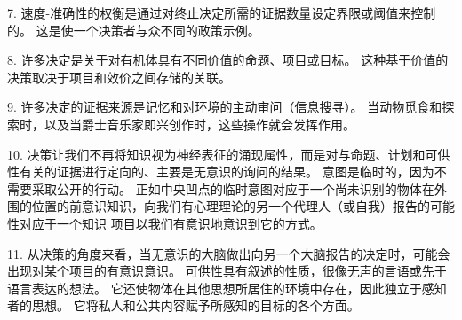 7. 速度-准确性的权衡是通过对终止决定所需的证据数量设定界限或阈值来控制的。
这是使一个决策者与众不同的政策示例。


8. 许多决定是关于对有机体具有不同价值的命题、项目或目标。
这种基于价值的决策取决于项目和效价之间存储的关联。 


9. 许多决定的证据来源是记忆和对环境的主动审问（信息搜寻）。
当动物觅食和探索时，以及当爵士音乐家即兴创作时，这些操作就会发挥作用。


10. 决策让我们不再将知识视为神经表征的涌现属性，而是对与命题、计划和可供性有关的证据进行定向的、主要是无意识的询问的结果。
意图是临时的，因为不需要采取公开的行动。
正如中央凹点的临时意图对应于一个尚未识别的物体在外围的位置的前意识知识，向我们有心理理论的另一个代理人（或自我）报告的可能性对应于一个知识 项目以我们有意识地意识到它的方式。


11. 从决策的角度来看，当无意识的大脑做出向另一个大脑报告的决定时，可能会出现对某个项目的有意识意识。
可供性具有叙述的性质，很像无声的言语或先于语言表达的想法。
它还使物体在其他思想所居住的环境中存在，因此独立于感知者的思想。
它将私人和公共内容赋予所感知的目标的各个方面。


